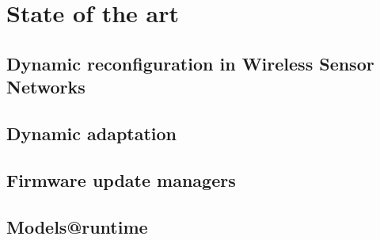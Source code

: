 \chapter{State of the art}
\label{sec:stateOfTheArt}

\section{Dynamic reconfiguration in Wireless Sensor Networks}

\section{Dynamic adaptation}

\section{Firmware update managers}

\section{Models@runtime}